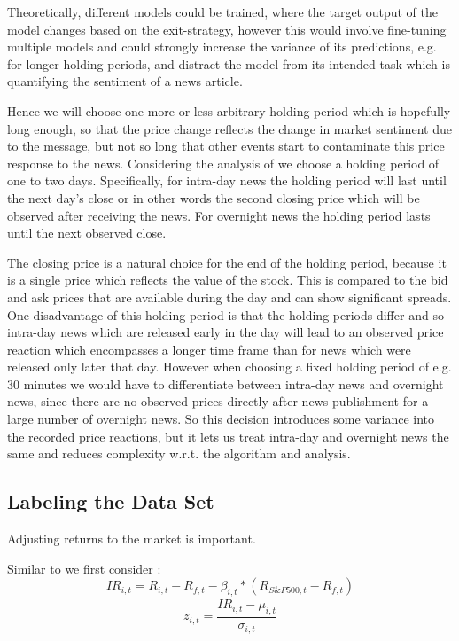 \documentclass[12pt,a4paper]{article}
\begin{document}
	Theoretically, different models could be trained, where the target output of the model changes based on the exit-strategy, 
	however this would involve fine-tuning multiple models and could strongly increase the variance of its predictions, e.g. for longer holding-periods, 
	and distract the model from its intended task which is quantifying the sentiment of a news article.
	
	Hence we will choose one more-or-less arbitrary holding period which is hopefully long enough, so that the price change
	reflects the change in market sentiment due to the message, but not so long that other events start to contaminate this price response to the news.
	Considering the analysis of \cite{ke_predicting_2020} we choose a holding period of one to two days.
	Specifically, for intra-day news the holding period will last until the next day's close or in other words
	the second closing price which will be observed after receiving the news.
	For overnight news the holding period lasts until the next observed close.
	
	The closing price is a natural choice for the end of the holding period, because it is a single price which reflects the value of the stock. 
	This is compared to the bid and ask prices that are available during the day and can show significant spreads.
	One disadvantage of this holding period is that the holding periods differ and so intra-day news which are released
	early in the day will lead to an observed price reaction which encompasses a longer time frame than for news which were released only later that day.
	However when choosing a fixed holding period of e.g. 30 minutes we would have to differentiate between intra-day news and overnight news, since there are no observed prices directly after news publishment for a large number of overnight news.
	So this decision introduces some variance into the recorded price reactions, but it lets us treat intra-day and overnight news the same and reduces complexity w.r.t. the algorithm and analysis.
	
	\subsection{Labeling the Data Set}
	Adjusting returns to the market is important.
	
	
	Similar to \cite{salbrechter_financial_2021} we first consider :
	$$
	IR_{i, t}=R_{i, t}-R_{f, t}-\beta_{i, t} *\left(R_{S \& P 500, t}-R_{f, t}\right)
	$$
	$$
	z_{i, t}=\frac{\overline{I R}_{i, t}-\mu_{i, t}}{\sigma_{i, t}}
	$$
	
\end{document}
